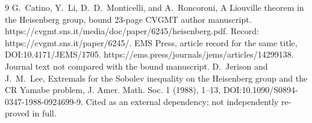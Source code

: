 \documentclass[10pt]{article}
\begin{document}
9 G. Catino, Y. Li, D. D. Monticelli, and A. Roncoroni, A Liouville theorem in the Heisenberg group, bound 23-page CVGMT author manuscript. https://cvgmt.sns.it/media/doc/paper/6245/heisenberg.pdf. Record: https://cvgmt.sns.it/paper/6245/. EMS Press, article record for the same title, DOI:10.4171/JEMS/1705. https://ems.press/journals/jems/articles/14299138. Journal text not compared with the bound manuscript. D. Jerison and J. M. Lee, Extremals for the Sobolev inequality on the Heisenberg group and the CR Yamabe problem, J. Amer. Math. Soc. 1 (1988), 1–13, DOI:10.1090/S0894-0347-1988-0924699-9. Cited as an external dependency; not independently re-proved in full.\par
\end{document}
